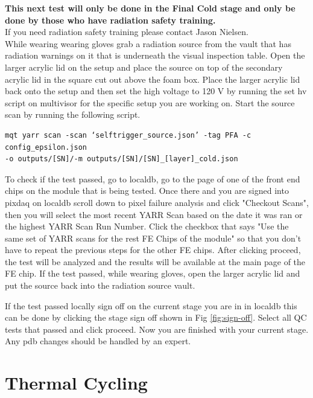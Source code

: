 \documentclass[12pt]{article}
\begin{document}
\textbf{This next test will only be done in the Final Cold stage and only be done by those who have radiation safety training.}\\

If you need radiation safety training please contact Jason Nielsen. \\

While wearing wearing gloves grab a radiation source from the vault that has radiation warnings on it that is underneath the visual inspection table. Open the larger acrylic lid on the setup and place the source on top of the secondary acrylic lid in the square cut out above the foam box. Place the larger acrylic lid back onto the setup and then set the high voltage to 120 V by running the set hv script on multivisor for the specific setup you are working on. Start the source scan by running the following script. 

\begin{verbatim}
mqt yarr scan -scan ‘selftrigger_source.json’ -tag PFA -c config_epsilon.json 
-o outputs/[SN]/-m outputs/[SN]/[SN]_[layer]_cold.json  
\end{verbatim}

To check if the test passed, go to localdb, go to the page of one of the front end chips on the module that is being tested. Once there and you are signed into pixdaq on localdb scroll down to pixel failure analysis and click "Checkout Scans", then you will select the most recent YARR Scan based on the date it was ran or the highest YARR Scan Run Number. Click the checkbox that says "Use the same set of YARR scans for the rest FE Chips of the module" so that you don't have to repeat the previous steps for the other FE chips. After clicking proceed, the test will be analyzed and the results will be available at the main page of the FE chip. If the test passed, while wearing gloves, open the larger acrylic lid and put the source back into the radiation source vault. 

If the test passed locally sign off on the current stage you are in in localdb this can be done by clicking the stage sign off shown in Fig \ref{fig:sign-off}. Select all QC tests that passed and click proceed. Now you are finished with your current stage. Any pdb changes should be handled by an expert. 

\section{Thermal Cycling}
\end{document}
